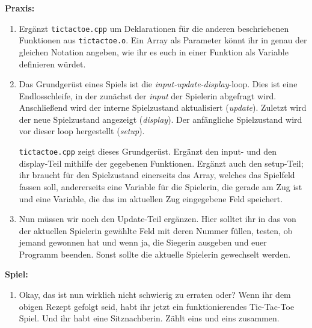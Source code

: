 \textbf{Praxis:}
\begin{enumerate}
    \item Ergänzt \texttt{tictactoe.cpp} um Deklarationen für die anderen
        beschriebenen Funktionen aus \texttt{tictactoe.o}. Ein Array als
        Parameter könnt ihr in genau der gleichen Notation angeben, wie ihr es
        euch in einer Funktion als Variable definieren würdet.
    \item Das Grundgerüst eines Spiels ist die \emph{input-update-display}-loop.
        Dies ist eine Endlosschleife, in der zunächst der \emph{input} der
        Spielerin abgefragt wird. Anschließend wird der interne Spielzustand
        aktualisiert (\emph{update}). Zuletzt wird der neue Spielzustand
        angezeigt (\emph{display}). Der anfängliche Spielzustand wird vor
        dieser loop hergestellt (\emph{setup}).

        \texttt{tictactoe.cpp} zeigt dieses Grundgerüst. Ergänzt den input- und
        den display-Teil mithilfe der gegebenen Funktionen. Ergänzt auch den
        setup-Teil; ihr braucht für den Spielzustand einerseits das Array,
        welches das Spielfeld fassen soll, andererseits eine Variable für die
        Spielerin, die gerade am Zug ist und eine Variable, die das im
        aktuellen Zug eingegebene Feld speichert.
    \item Nun müssen wir noch den Update-Teil ergänzen. Hier solltet ihr in das
        von der aktuellen Spielerin gewählte Feld mit deren Nummer füllen,
        testen, ob jemand gewonnen hat und wenn ja, die Siegerin ausgeben und
        euer Programm beenden. Sonst sollte die aktuelle Spielerin gewechselt
        werden.
\end{enumerate}

\textbf{Spiel:}
\begin{enumerate}
    \item Okay, das ist nun wirklich nicht schwierig zu erraten oder? Wenn ihr
        dem obigen Rezept gefolgt seid, habt ihr jetzt ein funktionierendes
        Tic-Tac-Toe Spiel. Und ihr habt eine Sitznachberin. Zählt eins und eins
        zusammen.
\end{enumerate}
